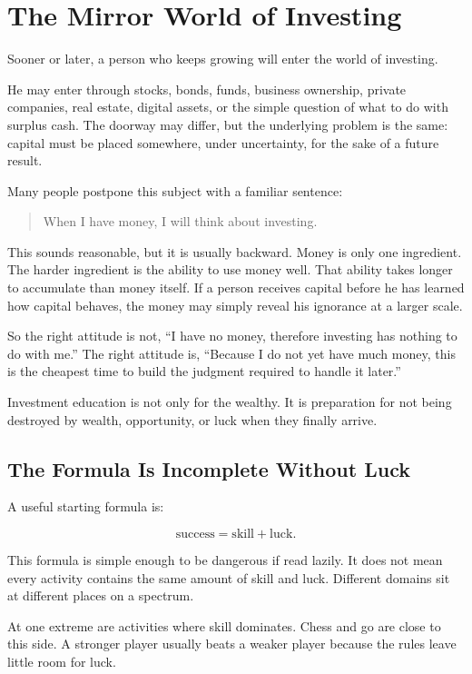 \chapter{The Mirror World of Investing}

Sooner or later, a person who keeps growing will enter the world of investing.

He may enter through stocks, bonds, funds, business ownership, private companies, real estate, digital assets, or the simple question of what to do with surplus cash. The doorway may differ, but the underlying problem is the same: capital must be placed somewhere, under uncertainty, for the sake of a future result.

Many people postpone this subject with a familiar sentence:

\begin{quote}
When I have money, I will think about investing.
\end{quote}

This sounds reasonable, but it is usually backward. Money is only one ingredient. The harder ingredient is the ability to use money well. That ability takes longer to accumulate than money itself. If a person receives capital before he has learned how capital behaves, the money may simply reveal his ignorance at a larger scale.

So the right attitude is not, ``I have no money, therefore investing has nothing to do with me.'' The right attitude is, ``Because I do not yet have much money, this is the cheapest time to build the judgment required to handle it later.''

Investment education is not only for the wealthy. It is preparation for not being destroyed by wealth, opportunity, or luck when they finally arrive.

\section*{The Formula Is Incomplete Without Luck}

A useful starting formula is:

\[
\text{success} = \text{skill} + \text{luck}.
\]

This formula is simple enough to be dangerous if read lazily. It does not mean every activity contains the same amount of skill and luck. Different domains sit at different places on a spectrum.

At one extreme are activities where skill dominates. Chess and go are close to this side. A stronger player usually beats a weaker player because the rules leave little room for luck.

